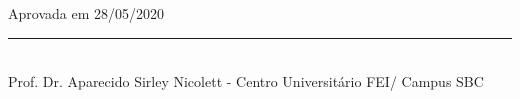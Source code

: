 			\begin{flushleft}%
			    {Aprovada em 28/05/2020}\\
						
				\vspace*{2 cm}%
				
				\vspace*{1 cm}%
			
				\vspace*{1 cm}%
				\rule{13 cm}{.1 mm}\\
				Prof. Dr. Aparecido Sirley Nicolett - Centro Universitário FEI/ Campus SBC
				
				\vspace*{1 cm}%
								
	
				\vspace*{1.3 cm}%
		    \end{flushleft}%